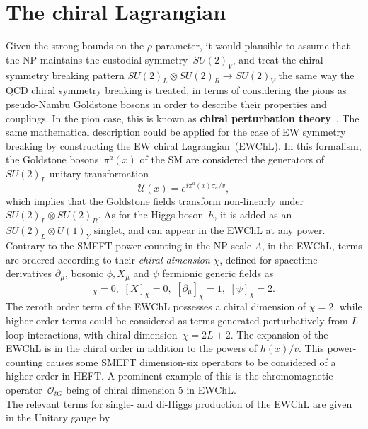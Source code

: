 \section{The chiral Lagrangian \label{sec:chiral}}
Given the strong bounds on the $\rho$ parameter, it would plausible to assume that the NP maintains the custodial symmetry~$SU(2)_V$, and treat the chiral symmetry breaking pattern $SU(2)_L \otimes SU(2)_R \to SU(2)_V$  the same way the QCD chiral symmetry breaking is treated, in terms of considering the pions as pseudo-Nambu Goldstone bosons in order to describe their properties and couplings. In the pion case, this is known as \textbf{chiral perturbation theory}~\cite{GASSER1984142,GASSER1985465}. The same mathematical description could be applied for the case of EW symmetry breaking by constructing the EW chiral Lagrangian~(EWChL).   In this formalism, the Goldstone bosons~$\pi^a(x)$ of the SM are considered the generators of $SU(2)_L$ unitary transformation
\begin{equation}
 \mathcal U(x) = e^{ i \pi^a(x)\sigma_a/v }, 
\end{equation}
which implies that the Goldstone fields transform non-linearly under~$SU(2)_L \otimes SU(2)_R$.  As for the Higgs boson~$h$, it is added as an $SU(2)_L \otimes U(1)_Y$ singlet, and can appear in the EWChL at any power. Contrary to the SMEFT power counting in the NP scale $ \Lambda$, in the EWChL, terms are ordered according to their \emph{chiral dimension} $\chi$, defined for spacetime derivatives $\partial_\mu$,  bosonic $\phi, X_\mu$ and $\psi$ fermionic generic fields as~\cite{Buchalla:2013rka,Buchalla:2015wfa}
\begin{equation}
[\phi]_\chi =0,\,\, [X]_\chi =0,\,\, [\partial_\mu ]_\chi =1, \,\, [\psi]_\chi =2.
\end{equation}
The zeroth order term of the EWChL possesses a chiral dimension of $\chi=2$, while higher order terms could be considered as terms generated perturbatively from $L$ loop interactions, with chiral dimension~$\chi= 2L+2$. The expansion of the EWChL is in the chiral order in addition to the powers of $h(x)/v$. This power-counting causes some SMEFT dimension-six operators to be considered of a higher order in HEFT. A prominent example of this is the chromomagnetic operator~$\mathcal O_{tG}$ being of chiral dimension 5 in EWChL. \\
The relevant terms for single- and di-Higgs production of the EWChL are given in the Unitary gauge by~\cite{LHCHiggsCrossSectionWorkingGroup:2016ypw,DiVita:2017eyz}

